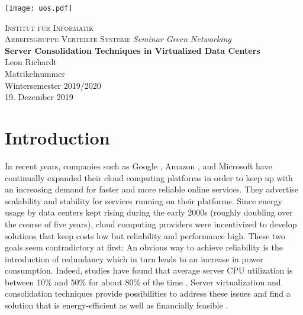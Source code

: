 \documentclass[12pt, a4paper]{scrartcl}
\begin{document}

\begin{titlepage}
    \centering
    \thispagestyle{empty}

    \begin{center}
        \texttt{[image: uos.pdf]}
    \end{center}

    \LARGE{\textsc{Institut für Informatik\\Arbeitsgruppe Verteilte Systeme}}
    \vfill
    \LARGE{\textit{Seminar Green Networking}}\\
    \vspace{8mm}
    \huge{\textbf{Server Consolidation Techniques in Virtualized Data Centers}}\\
    \vspace{9mm}
    \LARGE{Leon Richardt}\\
    \vspace{0.2cm}
    \normalsize{Matrikelnummer}\\
    \vspace{4cm}
    \large{Wintersemester 2019/2020}\\
    \vspace{0.2cm}
    \large{19. Dezember 2019}
    \vfill
\end{titlepage}
\newpage

\tableofcontents
\newpage

\pagestyle{plain}

\section{Introduction}\label{sec:intro}
In recent years, companies such as Google \cite{google_cloud_2019}, Amazon \cite{amazon_ec2_2019}, and Microsoft \cite{microsoft_azure_2019} have continually expanded their cloud computing platforms in order to keep up with an increasing demand for faster and more reliable online services.
They advertise scalability and stability for services running on their platforms.
Since energy usage by data centers kept rising during the early 2000s \cite[25-32]{brown_report_2008} (roughly doubling over the course of five years), cloud computing providers were incentivized to develop solutions that keep costs low but reliability and performance high.
These two goals seem contradictory at first: An obvious way to achieve reliability is the introduction of redundancy which in turn leads to an increase in power consumption.
Indeed, studies have found that average server CPU utilization is between 10\% and 50\% for about 80\% of the time \cite{barroso_epc_2007}.
Server virtualization and consolidation techniques provide possibilities to address these issues and find a solution that is energy-efficient as well as financially feasible \cite{varasteh_survey_2017}.
\end{document}
